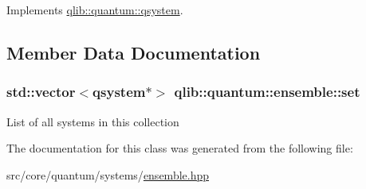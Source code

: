 Implements \hyperlink{classqlib_1_1quantum_1_1qsystem_a5626857e5dc87dc2bdbb1f4d0b0401f9}{qlib\+::quantum\+::qsystem}.



\subsection{Member Data Documentation}
\subsubsection[{\texorpdfstring{set}{set}}]{\setlength{\rightskip}{0pt plus 5cm}std\+::vector$<${\bf qsystem}$\ast$$>$ qlib\+::quantum\+::ensemble\+::set\hspace{0.3cm}{\ttfamily [private]}}\hypertarget{classqlib_1_1quantum_1_1ensemble_ab77e11f30898f29060ff97236ec26319}{}\label{classqlib_1_1quantum_1_1ensemble_ab77e11f30898f29060ff97236ec26319}
List of all systems in this collection 

The documentation for this class was generated from the following file\+:\begin{DoxyCompactItemize}
\item 
src/core/quantum/systems/\hyperlink{ensemble_8hpp}{ensemble.\+hpp}\end{DoxyCompactItemize}
